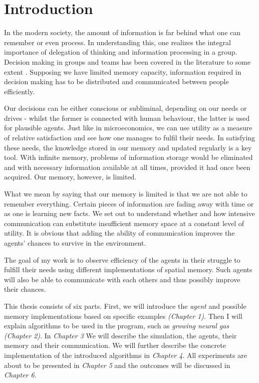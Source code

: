 \chapter*{Introduction}

In the modern society, the amount of information is far behind what one can remember or even process. In understanding this, one realizes the integral importance of delegation of thinking and information processing in a group. Decision making in groups and teams has been covered in the literature to some extent \cite{Black:groupdecisionmaking}. Supposing we have limited memory capacity, information required in decision making has to be distributed and communicated between people efficiently.

Our decisions can be either conscious or subliminal, depending on our needs or drives - whilst the former is connected with human behaviour, the latter is used for plausible agents. Just like in microeconomics, we can use utility as a measure of relative satisfaction \cite{Varian:micro} and see how one manages to fulfil their needs. In satisfying these needs, the knowledge stored in our memory and updated regularly is a key tool. With infinite memory, problems of information storage would be eliminated and with necessary information available at all times, provided it had once been acquired. Our memory, however, is limited. 

What we mean by saying that our memory is limited is that we are not able to remember everything. Certain pieces of information are fading away with time or as one is learning new facts. We set out to understand whether and how intensive communication can substitute insufficient memory space at a constant level of utility. It is obvious that adding the ability of communication improves the agents' chances to survive in the environment.

The goal of my work is to observe efficiency of the agents in their struggle to fulfill their needs using different implementations of spatial memory. Such agents will also be able to communicate with each others and thus possibly improve their chances.

This thesis consists of six parts. First, we will introduce the \emph{agent} and possible memory implementations based on specific examples \emph{(Chapter 1)}. Then I will explain algorithms to be used in the program, such as \emph{growing neural gas} \emph{(Chapter 2)}. In \emph{Chapter 3} We will describe the simulation, the agents, their memory and their communication. We will further describe the concrete implementation of the introduced algorithms in \emph{Chapter 4}. All experiments are about to be presented in \emph{Chapter 5} and the outcomes will be discussed in \emph{Chapter 6}.